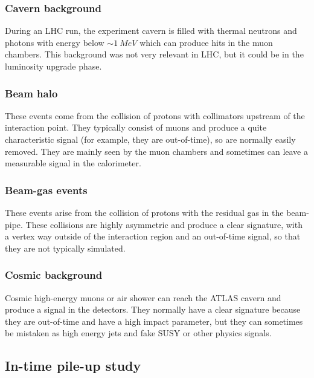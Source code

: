 \documentclass[a4paper,twoside,12pt]{article}
\begin{document}

\subsubsection*{Cavern background}
During an LHC run, the experiment cavern is filled with thermal neutrons and photons with 
energy below $\sim 1\ MeV$ which can produce hits in the muon chambers. This background
was not very relevant in LHC, but it could be in the luminosity upgrade phase\cite{ATLAS_pileup}.

\subsubsection*{Beam halo}
These events come from the collision of protons with collimators upstream of the 
interaction point. They typically consist of muons and produce a quite characteristic signal (for example, they are out-of-time), so are normally easily removed. They are mainly seen by the muon chambers and sometimes
can leave a measurable signal in the calorimeter\cite{ATLAS_pileup}. 

\subsubsection*{Beam-gas events}
These events arise from the collision of protons with the residual gas in the beam-pipe. These
collisions are highly asymmetric and produce a clear signature, with a vertex way outside of
the interaction region and an out-of-time signal, so that they are not typically simulated\cite{ATLAS_pileup}.

\subsubsection*{Cosmic background}
Cosmic high-energy muons or air shower can reach the ATLAS cavern and produce a signal in the detectors.
They normally have a clear signature because they are out-of-time and have a high impact
parameter, but they can sometimes
be mistaken as high energy jets and fake SUSY or other physics signals\cite{ATLAS_cosmic}. \\

\subsection{In-time pile-up study}
\end{document}
